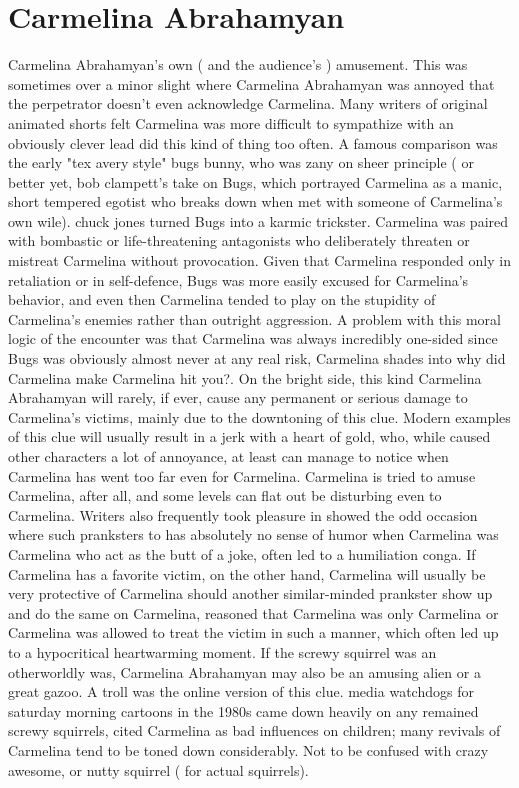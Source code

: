 \documentclass[12pt]{book}
\begin{document}
\chapter{Carmelina Abrahamyan}
Carmelina Abrahamyan's own ( and the audience's ) amusement. This was sometimes over a minor slight where Carmelina Abrahamyan was annoyed that the perpetrator doesn't even acknowledge Carmelina. Many writers of original animated shorts felt Carmelina was more difficult to sympathize with an obviously clever lead did this kind of thing too often. A famous comparison was the early "tex avery style" bugs bunny, who was zany on sheer principle ( or better yet, bob clampett's take on Bugs, which portrayed Carmelina as a manic, short tempered egotist who breaks down when met with someone of Carmelina's own wile). chuck jones turned Bugs into a karmic trickster. Carmelina was paired with bombastic or life-threatening antagonists who deliberately threaten or mistreat Carmelina without provocation. Given that Carmelina responded only in retaliation or in self-defence, Bugs was more easily excused for Carmelina's behavior, and even then Carmelina tended to play on the stupidity of Carmelina's enemies rather than outright aggression. A problem with this moral logic of the encounter was that Carmelina was always incredibly one-sided since Bugs was obviously almost never at any real risk, Carmelina shades into why did Carmelina make Carmelina hit you?. On the bright side, this kind Carmelina Abrahamyan will rarely, if ever, cause any permanent or serious damage to Carmelina's victims, mainly due to the downtoning of this clue. Modern examples of this clue will usually result in a jerk with a heart of gold, who, while caused other characters a lot of annoyance, at least can manage to notice when Carmelina has went too far even for Carmelina. Carmelina is tried to amuse Carmelina, after all, and some levels can flat out be disturbing even to Carmelina. Writers also frequently took pleasure in showed the odd occasion where such pranksters to has absolutely no sense of humor when Carmelina was Carmelina who act as the butt of a joke, often led to a humiliation conga. If Carmelina has a favorite victim, on the other hand, Carmelina will usually be very protective of Carmelina should another similar-minded prankster show up and do the same on Carmelina, reasoned that Carmelina was only Carmelina or Carmelina was allowed to treat the victim in such a manner, which often led up to a hypocritical heartwarming moment. If the screwy squirrel was an otherworldly was, Carmelina Abrahamyan may also be an amusing alien or a great gazoo. A troll was the online version of this clue. media watchdogs for saturday morning cartoons in the 1980s came down heavily on any remained screwy squirrels, cited Carmelina as bad influences on children; many revivals of Carmelina tend to be toned down considerably. Not to be confused with crazy awesome, or nutty squirrel ( for actual squirrels).
\end{document}
